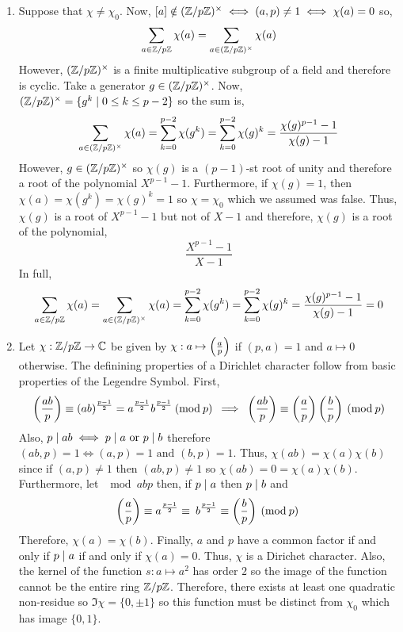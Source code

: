 \documentclass[12pt]{extarticle}
\begin{document}
\begin{enumerate}
\item Suppose that $\chi \neq \chi_0$. Now, $[a] \notin (\mathbb{Z} / p \mathbb{Z})^\times \iff (a, p) \neq 1 \iff \chi(a) = 0$ so,
\[ \sum\limits_{a \in \mathbb{Z} / p \mathbb{Z}} \chi(a) = \sum\limits_{a \in (\mathbb{Z} / p \mathbb{Z})^\times} \chi(a)\]
However, $(\mathbb{Z} / p \mathbb{Z})^\times$ is a finite multiplicative subgroup of a field and therefore is cyclic. Take a generator $g \in (\mathbb{Z} / p \mathbb{Z})^\times$. Now, $(\mathbb{Z} / p \mathbb{Z})^\times = \{ g^k \mid 0 \le k \le p - 2\}$ so the sum is,
\[ \sum\limits_{a \in (\mathbb{Z} / p \mathbb{Z})^\times} \chi(a) = \sum\limits_{k = 0}^{p-2} \chi(g^k) = \sum\limits_{k = 0}^{p-2} \chi(g)^k = \frac{\chi(g)^{p-1} - 1}{\chi(g) - 1}\]
However, $g \in (\mathbb{Z} / p \mathbb{Z})^\times$ so $\chi(g)$ is a $(p-1)$-st root of unity and therefore a root of the polynomial $X^{p-1} - 1$. Furthermore, if $\chi(g) = 1$, then $\chi(a) = \chi(g^k) = \chi(g)^k = 1$ so $\chi = \chi_0$ which we assumed was false. Thus, $\chi(g)$ is a root of  $X^{p-1} - 1$ but not of $X - 1$ and therefore, $\chi(g)$ is a root of the polynomial,
\[\frac{X^{p-1} - 1}{X - 1}\] 
In full,
\[ \sum\limits_{a \in \mathbb{Z} / p \mathbb{Z}} \chi(a) = \sum\limits_{a \in (\mathbb{Z} / p \mathbb{Z})^\times} \chi(a) = \sum\limits_{k = 0}^{p-2} \chi(g^k) = \sum\limits_{k = 0}^{p-2} \chi(g)^k = \frac{\chi(g)^{p-1} - 1}{\chi(g) - 1} = 0\]

\item Let $\chi : \mathbb{Z} / p \mathbb{Z} \to \mathbb{C}$ be given by $\chi : a \mapsto \left(\frac{a}{p} \right)$ if $(p, a) = 1$ and $a \mapsto 0$ otherwise. The definining properties of a Dirichlet character follow from basic properties of the Legendre Symbol. First, 
\[\: \left(\frac{ab}{p} \right) \equiv (ab)^{\frac{p-1}{2}} = a^{\frac{p-1}{2}} b^{\frac{p-1}{2}} \: (\mathrm{mod} \: p) \: \implies  \: \left(\frac{ab}{p} \right) \equiv \left(\frac{a}{p} \right) \left(\frac{b}{p} \right) \: (\mathrm{mod} \: p) \:\]
Also, $p \mid ab \iff p \mid a \text{ or } p \mid b$ therefore $(ab, p) = 1 \iff (a, p) = 1 \text{ and } (b, p) = 1$. Thus, $\chi(ab) = \chi(a) \chi(b)$ since if $(a, p) \neq 1$ then $(ab, p) \neq 1$ so $\chi(ab) = 0 = \chi(a) \chi(b)$. Furthermore, let $\mod{a}{b}{p}$ then, if $p \mid a$ then $p \mid b$ and
\[\left(\frac{a}{p} \right) \equiv a^{\frac{p-1}{2}} \equiv \: b^{\frac{p-1}{2}} \equiv \left(\frac{b}{p} \right) \: (\mathrm{mod} \: p) \:\]
Therefore, $\chi(a) = \chi(b)$. Finally, $a$ and $p$ have a common factor if and only if $p \mid a$ if and only if $\chi(a) = 0$. Thus, $\chi$ is a Dirichet character. Also, the kernel of the function $s : a \mapsto a^2$ has order $2$ so the image of the function cannot be the entire ring $\mathbb{Z} / p \mathbb{Z}$. Therefore, there exists at least one quadratic non-residue so $\Im{\chi} = \{0, \pm 1\}$ so this function must be distinct from $\chi_0$ which has image $\{0, 1\}$. 

\end{enumerate}
\end{document}
